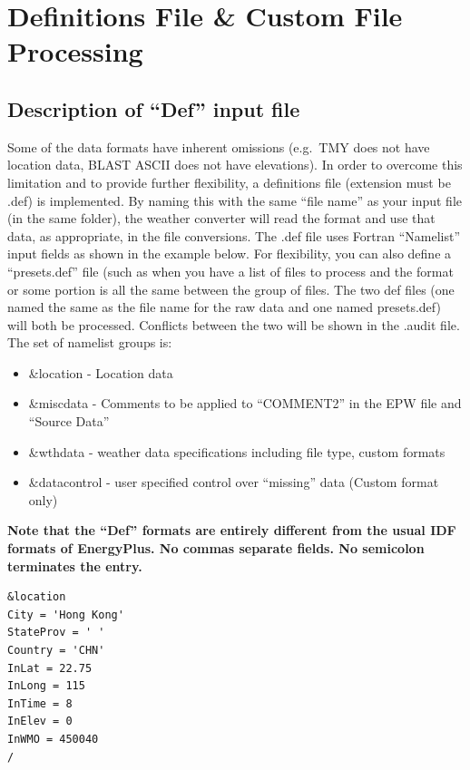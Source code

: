 \section{Definitions File \& Custom File Processing}\label{definitions-file-custom-file-processing}

\subsection{\texorpdfstring{Description of ``Def'' input file}{Description of Def input file}}\label{description-of-def-input-file}

Some of the data formats have inherent omissions (e.g.~TMY does not have location data, BLAST ASCII does not have elevations). In order to overcome this limitation and to provide further flexibility, a definitions file (extension must be .def) is implemented. By naming this with the same ``file name'' as your input file (in the same folder), the weather converter will read the format and use that data, as appropriate, in the file conversions. The .def file uses Fortran ``Namelist'' input fields as shown in the example below. For flexibility, you can also define a ``presets.def'' file (such as when you have a list of files to process and the format or some portion is all the same between the group of files. The two def files (one named the same as the file name for the raw data and one named presets.def) will both be processed. Conflicts between the two will be shown in the .audit file. The set of namelist groups is:

\begin{itemize}
\item
  \&location - Location data
\item
  \&miscdata - Comments to be applied to ``COMMENT2'' in the EPW file and ``Source Data''
\item
  \&wthdata - weather data specifications including file type, custom formats
\item
  \&datacontrol - user specified control over ``missing'' data (Custom format only)
\end{itemize}

\textbf{Note that the ``Def'' formats are entirely different from the usual IDF formats of EnergyPlus. No commas separate fields. No semicolon terminates the entry.}

\begin{lstlisting}
&location
City = 'Hong Kong'
StateProv = ' '
Country = 'CHN'
InLat = 22.75
InLong = 115
InTime = 8
InElev = 0
InWMO = 450040
/
\end{lstlisting}

